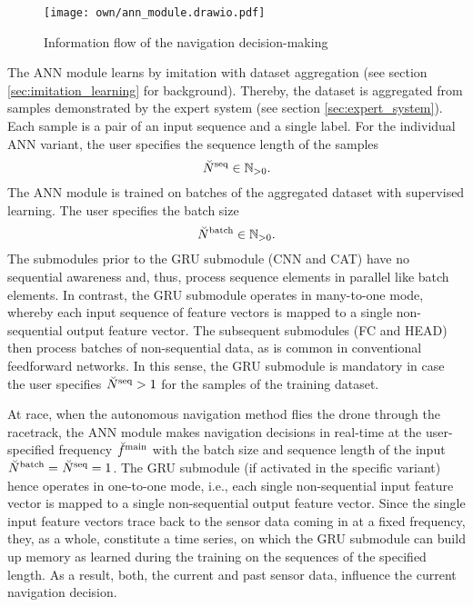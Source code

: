 \begin{figure}[h]
    \centering
    \texttt{[image: own/ann\_module.drawio.pdf]}
    \caption[
        Information flow of the navigation decision-making
    ]{
        Information flow of the navigation decision-making
    \label{fig:perception_and_reasoning}
    }
\end{figure}


The ANN module learns by
imitation with dataset aggregation
(see section \ref{sec:imitation_learning} for background).
Thereby, the dataset is aggregated from samples demonstrated by the expert
system (see section \ref{sec:expert_system}).
Each sample is a pair of an input sequence and a single label.
For the individual ANN variant,
the user specifies the sequence length of the samples
\begin{equation} \label{eq:seq_len}
    {}_{}^{} \breve{N}^{\text{seq}}_{} \in \mathbb{N}_{>0}.
\end{equation}
The ANN module is trained on
batches of the aggregated dataset with supervised learning.
The user specifies the batch size
\begin{equation}
    {}_{}^{} \breve{N}^{\text{batch}}_{} \in \mathbb{N}_{>0}.
\end{equation}
The submodules prior to the GRU submodule (CNN and CAT)
have no sequential awareness and, thus, 
process sequence elements in parallel like batch elements.
In contrast, the GRU submodule
operates in many-to-one mode,
whereby each input sequence of feature vectors is mapped to a 
single non-sequential output feature vector.
The subsequent submodules (FC and HEAD)
then process batches of non-sequential data, 
as is common in conventional feedforward networks.
In this sense,
the GRU submodule is mandatory in case the user specifies
${}_{}^{} \breve{N}^{\text{seq}}_{} > 1$ for the samples of the training dataset.

At race,
when the autonomous navigation method flies the drone through the racetrack,
the ANN module makes navigation decisions 
in real-time at the user-specified frequency
${}_{}^{} \breve{f}^{\text{main}}_{}$ with the batch size and sequence length 
of the input
${}_{}^{} \breve{N}^{\text{batch}}_{} = {}_{}^{} \breve{N}^{\text{seq}}_{} =1$.
The GRU submodule (if activated in the specific variant) 
hence operates in one-to-one mode,
i.e., 
each single non-sequential input feature vector
is mapped to a single non-sequential output feature vector.
Since the single input feature vectors 
trace back to the sensor data coming in at a fixed frequency,
they, as a whole, constitute a time series,
on which the GRU submodule can build up memory
as learned during the training on the sequences of the specified length.
As a result, both, the current and past sensor data, 
influence the current navigation decision.





